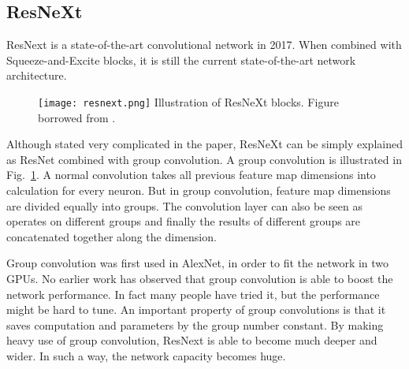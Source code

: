 \subsection{ResNeXt}

ResNext is a state-of-the-art convolutional network in 2017\cite{xie2017aggregated}. When combined with Squeeze-and-Excite blocks, it is still the current state-of-the-art network architecture.
\begin{figure}[!htp]
	\centering
	\texttt{[image: resnext.png]}
	{Illustration of ResNeXt blocks. Figure borrowed from \cite{xie2017aggregated}.}
	\label{fig:resnext}
\end{figure}
Although stated very complicated in the paper, ResNeXt can be simply explained as ResNet combined with group convolution. A group convolution is illustrated in Fig.~\ref{fig:resnext}.  A normal convolution takes all previous feature map dimensions into calculation for every neuron. But in group convolution, feature map dimensions are divided equally into groups. The convolution layer can also be seen as operates on different groups and finally the results of different groups are concatenated together along the dimension.

Group convolution was first used in AlexNet, in order to fit the network in two GPUs. No earlier work has observed that group convolution is able to boost the network performance. In fact many people have tried it, but the performance might be hard to tune. An important property of group convolutions is that it saves computation and parameters by the group number constant. By making heavy use of group convolution, ResNext is able to become much deeper and wider. In such a way, the network capacity becomes huge.
